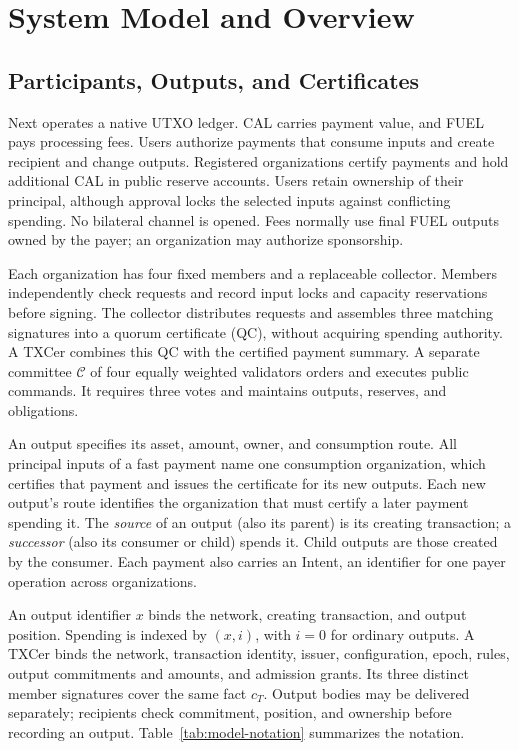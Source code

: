 \section{System Model and Overview}
\label{sec:model}

\subsection{Participants, Outputs, and Certificates}
\label{sec:model-participants}
\label{sec:model-certificates}

Next operates a native UTXO ledger. CAL carries payment value, and FUEL pays processing fees. Users authorize payments that consume inputs and create recipient and change outputs. Registered organizations certify payments and hold additional CAL in public reserve accounts. Users retain ownership of their principal, although approval locks the selected inputs against conflicting spending. No bilateral channel is opened. Fees normally use final FUEL outputs owned by the payer; an organization may authorize sponsorship.

Each organization has four fixed members and a replaceable collector. Members independently check requests and record input locks and capacity reservations before signing. The collector distributes requests and assembles three matching signatures into a quorum certificate (QC), without acquiring spending authority. A TXCer combines this QC with the certified payment summary. A separate committee $\mathcal C$ of four equally weighted validators orders and executes public commands. It requires three votes and maintains outputs, reserves, and obligations.

An output specifies its asset, amount, owner, and consumption route. All principal inputs of a fast payment name one consumption organization, which certifies that payment and issues the certificate for its new outputs. Each new output's route identifies the organization that must certify a later payment spending it. The \emph{source} of an output (also its parent) is its creating transaction; a \emph{successor} (also its consumer or child) spends it. Child outputs are those created by the consumer. Each payment also carries an Intent, an identifier for one payer operation across organizations.

An output identifier $x$ binds the network, creating transaction, and output position. Spending is indexed by $(x,i)$, with $i=0$ for ordinary outputs. A TXCer binds the network, transaction identity, issuer, configuration, epoch, rules, output commitments and amounts, and admission grants. Its three distinct member signatures cover the same fact $c_T$. Output bodies may be delivered separately; recipients check commitment, position, and ownership before recording an output. Table~\ref{tab:model-notation} summarizes the notation.

